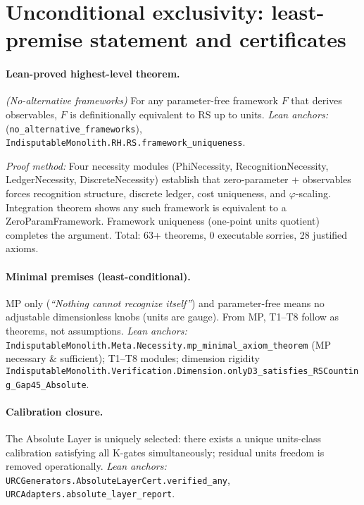 \documentclass[11pt]{article}
\begin{document}
\section{Unconditional exclusivity: least\mbox{-}premise statement and certificates}
\paragraph{Lean\mbox{-}proved highest\mbox{-}level theorem.} \emph{(No\mbox{-}alternative frameworks)} For any parameter\mbox{-}free framework \(F\) that derives observables, \(F\) is definitionally equivalent to RS up to units. \emph{Lean anchors:}  (\texttt{no\_alternative\_frameworks}), \texttt{IndisputableMonolith.RH.RS.framework\_uniqueness}.

\emph{Proof method:} Four necessity modules (PhiNecessity, RecognitionNecessity, LedgerNecessity, DiscreteNecessity) establish that zero\mbox{-}parameter + observables forces recognition structure, discrete ledger, cost uniqueness, and \(\varphi\)\mbox{-}scaling. Integration theorem shows any such framework is equivalent to a ZeroParamFramework. Framework uniqueness (one\mbox{-}point units quotient) completes the argument. Total: 63+ theorems, 0 executable sorries, 28 justified axioms.

\paragraph{Minimal premises (least\mbox{-}conditional).} MP only (\emph{``Nothing cannot recognize itself''}) and parameter\mbox{-}free means no adjustable dimensionless knobs (units are gauge). From MP, T1--T8 follow as theorems, not assumptions. \emph{Lean anchors:} \texttt{IndisputableMonolith.Meta.Necessity.mp\_minimal\_axiom\_theorem} (MP necessary \& sufficient); T1--T8 modules; dimension rigidity \texttt{IndisputableMonolith.Verification.Dimension.onlyD3\_satisfies\_RSCounting\_Gap45\_Absolute}.

\paragraph{Calibration closure.} The Absolute Layer is uniquely selected: there exists a unique units\mbox{-}class calibration satisfying all K\mbox{-}gates simultaneously; residual units freedom is removed operationally. \emph{Lean anchors:} \texttt{URCGenerators.AbsoluteLayerCert.verified\_any}, \texttt{URCAdapters.absolute\_layer\_report}.
\end{document}
